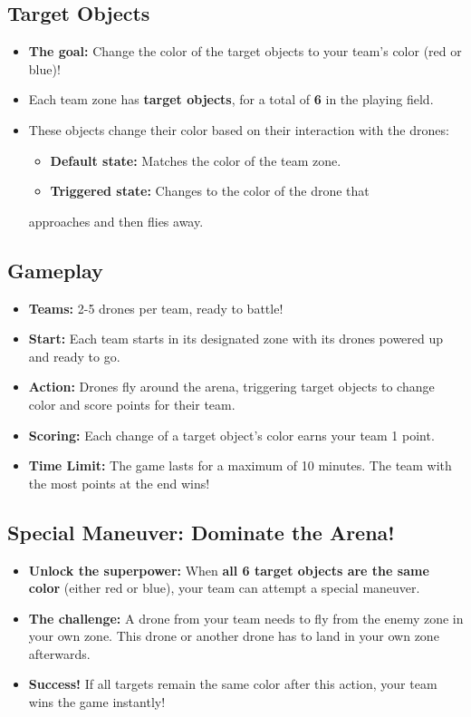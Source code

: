 \subsection{Target Objects}

\begin{itemize}
	\item \textbf{The goal:} Change the color of the target objects to your team's color (red or blue)!
	\item Each team zone has \textbf{target objects}, for a total of \textbf{6} in the playing field.
	\item These objects change their color based on their interaction with the drones:
	      \begin{itemize}
		      \item \textbf{Default state:} Matches the color of the team zone.
		      \item \textbf{Triggered state:} Changes to the color of the drone that
	      \end{itemize}
	      approaches and then flies away.
\end{itemize}



\subsection{Gameplay}

\begin{itemize}
	\item \textbf{Teams:} 2-5 drones per team, ready to battle!
	\item \textbf{Start:} Each team starts in its designated zone with its drones powered up and ready to go.
	\item \textbf{Action:} Drones fly around the arena, triggering target objects to change color and score points for their team.
	\item \textbf{Scoring:} Each change of a target object's color earns your team 1 point.
	\item \textbf{Time Limit:} The game lasts for a maximum of 10 minutes. The team with the most points at the end wins!
\end{itemize}


\subsection{Special Maneuver: Dominate the Arena!}

\begin{itemize}
	\item \textbf{Unlock the superpower:} When \textbf{all 6 target objects are the same color} (either red or blue), your team can attempt a special maneuver.
	\item \textbf{The challenge:} A drone from your team needs to fly from the enemy zone in your own zone. This drone or another drone has to land in your own zone afterwards.
	\item \textbf{Success!} If all targets remain the same color after this action, your team wins the game instantly!
\end{itemize}

